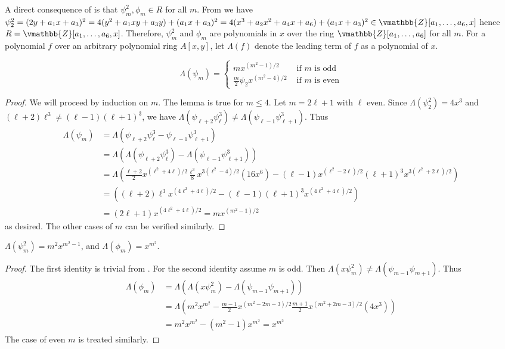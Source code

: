 A direct consequence of  is that $\psi_m^2, \phi_m \in R$ for all $m$. 
From  we have $\psi_2^2 = (2y + a_1x + a_3)^2 = 4(y^2 + a_1xy + a_3y) + 
(a_1x + a_3)^2 = 4(x^3 + a_2x^2 + a_4x + a_6) + (a_1x + a_3)^2 \in \vmathbb{Z}[a_1, \dots, a_6, x]$ 
hence $R = \vmathbb{Z}[a_1, \dots, a_6, x]$. Therefore, $\psi_m^2$ and $\phi_m$ are polynomials in 
$x$ over the ring $\vmathbb{Z}[a_1, \dots, a_6]$ for all $m$. For a polynomial $f$ over an arbitrary 
polynomial ring $A[x, y]$, let $\Lambda(f)$ denote the leading term of $f$ as a polynomial of $x$.
\begin{lemma}
\label{lemma:psi-lead}
$$
\Lambda(\psi_m) = 
\begin{cases}
mx^{(m^2 - 1) / 2} & \text{ if } m \text{ is odd} \\ 
\frac{m}{2}\psi_2x^{(m^2 - 4) / 2} & \text{ if } m \text{ is even}
\end{cases}
$$
\end{lemma}
\begin{proof}
We will proceed by induction on $m$. The lemma is true for $m \le 4$. Let $m = 2\ell + 1$ with 
$\ell$ even. Since $\Lambda(\psi_2^2) = 4x^3$ and $(\ell + 2)\ell^3 \ne (\ell - 1)(\ell + 1)^3$, we 
have $\Lambda(\psi_{\ell + 2}\psi_\ell^3) \ne \Lambda(\psi_{\ell - 1}\psi_{\ell + 1}^3)$. Thus
\begin{align*}
\Lambda(\psi_m) 
&= \Lambda(\psi_{\ell + 2}\psi_\ell^3 - \psi_{\ell - 1}\psi_{\ell + 1}^3) \\
&= \Lambda(\Lambda(\psi_{\ell + 2}\psi_\ell^3) - \Lambda(\psi_{\ell - 1}\psi_{\ell + 1}^3)) \\
&= \Lambda\left(\frac{\ell + 2}{2}x^{(\ell^2 + 4\ell) / 2}\frac{\ell^3}{8}x^{3(\ell^2 - 4) / 
2}(16x^6) - (\ell - 1)x^{(\ell^2 - 2\ell) / 2}(\ell + 1)^3x^{3(\ell^2 + 2\ell) / 2}\right) \\
&= ((\ell + 2)\ell^3x^{(4\ell^2 + 4\ell) / 2} - (\ell - 1)(\ell + 1)^3x^{(4\ell^2 + 4\ell) / 2}) \\
&= (2\ell + 1)x^{(4\ell^2 + 4\ell) / 2} = mx^{(m^2 - 1) / 2}
\end{align*} 
as desired. The other cases of $m$ can be verified similarly.
\end{proof}
\begin{corollary}
$\Lambda(\psi_m^2) = m^2x^{m^2 - 1}$, and $\Lambda(\phi_m) = x^{m^2}$.
\end{corollary}
\begin{proof}
The first identity is trivial from . For the second identity assume $m$ is 
odd. Then $\Lambda(x\psi_m^2) \ne \Lambda(\psi_{m - 1}\psi_{m + 1})$. Thus
\begin{align*}
\Lambda(\phi_m) 
&= \Lambda(\Lambda(x\psi_m^2) - \Lambda(\psi_{m - 1}\psi_{m + 1})) \\
&= \Lambda(m^2x^{m^2} - \frac{m - 1}{2}x^{(m^2 - 2m - 3) / 2}\frac{m + 1}{2}x^{(m^2 + 2m - 3) / 
2}(4x^3)) \\
&= m^2x^{m^2} - (m^2 - 1)x^{m^2} = x^{m^2}
\end{align*}
The case of even $m$ is treated similarly.
\end{proof}
